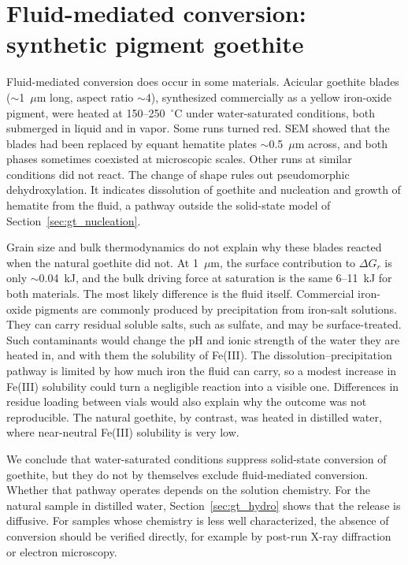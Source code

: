 \section{Fluid-mediated conversion: synthetic pigment goethite}
\label{sec:gt_pigment}

Fluid-mediated conversion does occur in some materials. Acicular goethite blades
($\sim$1~$\mu$m long, aspect ratio $\sim$4), synthesized commercially as a yellow iron-oxide
pigment, were heated at 150--250~$^\circ$C under water-saturated conditions, both submerged in
liquid and in vapor. Some runs turned red. SEM showed that the blades had been replaced by
equant hematite plates $\sim$0.5~$\mu$m across, and both phases sometimes coexisted at
microscopic scales. Other runs at similar conditions did not react. The change of shape
rules out pseudomorphic dehydroxylation. It indicates dissolution of goethite and nucleation
and growth of hematite from the fluid, a pathway outside the solid-state model of
Section~\ref{sec:gt_nucleation}.

Grain size and bulk thermodynamics do not explain why these blades reacted when the natural
goethite did not. At 1~$\mu$m, the surface contribution to $\Delta G_r$ is only
$\sim$0.04~kJ, and the bulk driving force at saturation is the same 6--11~kJ for both materials.
The most likely difference is the fluid itself. Commercial iron-oxide pigments are commonly produced by
precipitation from iron-salt solutions. They can carry residual soluble salts, such as sulfate,
and may be surface-treated. Such contaminants would change the pH and ionic strength of the
water they are heated in, and with them the solubility of Fe(III). The dissolution--precipitation
pathway is limited by how much iron the fluid can carry, so a modest increase in Fe(III)
solubility could turn a negligible reaction into a visible one. Differences in residue loading
between vials would also explain why the outcome was not reproducible. The natural goethite, by
contrast, was heated in distilled water, where near-neutral Fe(III) solubility is very low.

We conclude that water-saturated conditions suppress solid-state conversion of goethite, but
they do not by themselves exclude fluid-mediated conversion. Whether that pathway operates
depends on the solution chemistry. For the natural sample in distilled water,
Section~\ref{sec:gt_hydro} shows that the release is diffusive. For samples whose chemistry is
less well characterized, the absence of conversion should be verified directly, for example by
post-run X-ray diffraction or electron microscopy.



